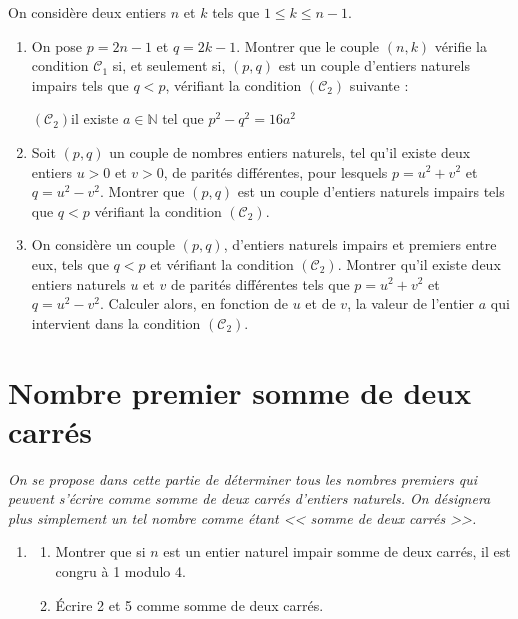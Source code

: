 \documentclass[landscape,twocolumn,leqno,a4paper,10pt]{report} %
\newcommand\n{\noindent}
\renewcommand{\leq}{\leqslant}
\begin{document}
\n On considère deux entiers $n$ et $k$ tels que $1 \leq k \leq n-1$.

\begin{enumerate}
	\item On pose $p=2 n-1$ et $q=2 k-1$. Montrer que le couple $(n, k)$ vérifie la condition $\mathcal{C}_{1}$ si, et seulement si, $(p, q)$ est un couple d'entiers naturels impairs tels que $q<p$, vérifiant la condition $\left(\mathcal{C}_{2}\right)$ suivante :
	\begin{center}
	$\left(\mathcal{C}_{2}\right)$\quad il existe $a \in \mathbb{N}$ tel que $p^{2}-q^{2}=16 a^{2}$
	\end{center}
	\item Soit $(p, q)$ un couple de nombres entiers naturels, tel qu'il existe deux entiers $u>0$ et $v>0$, de parités différentes, pour lesquels $p=u^{2}+v^{2}$ et $q=u^{2}-v^{2}$. Montrer que $(p, q)$ est un couple d'entiers naturels impairs tels que $q<p$ vérifiant la condition $\left(\mathcal{C}_{2}\right)$.
	\item On considère un couple $(p, q)$, d'entiers naturels impairs et premiers entre eux, tels que $q<p$ et vérifiant la condition $\left(\mathcal{C}_{2}\right)$. Montrer qu'il existe deux entiers naturels $u$ et $v$ de parités différentes tels que $p=u^{2}+v^{2}$ et $q=u^{2}-v^{2} .$ Calculer alors, en fonction de $u$ et de $v$, la valeur de l'entier $a$ qui intervient dans la condition $\left(\mathcal{C}_{2}\right)$.
\end{enumerate}

\newpage

\section{Nombre premier somme de deux carrés}

\n \textit{On se propose dans cette partie de déterminer tous les nombres premiers qui peuvent s'écrire comme somme de deux carrés d'entiers naturels. On désignera plus simplement un tel nombre comme étant << somme de deux carrés >>.}

\begin{enumerate}
	\item \begin{enumerate}
		\item Montrer que si $n$ est un entier naturel impair somme de deux carrés, il est congru à 1 modulo 4.
		\item Écrire 2 et 5 comme somme de deux carrés.
	\end{enumerate}
\end{enumerate}
\end{document}
